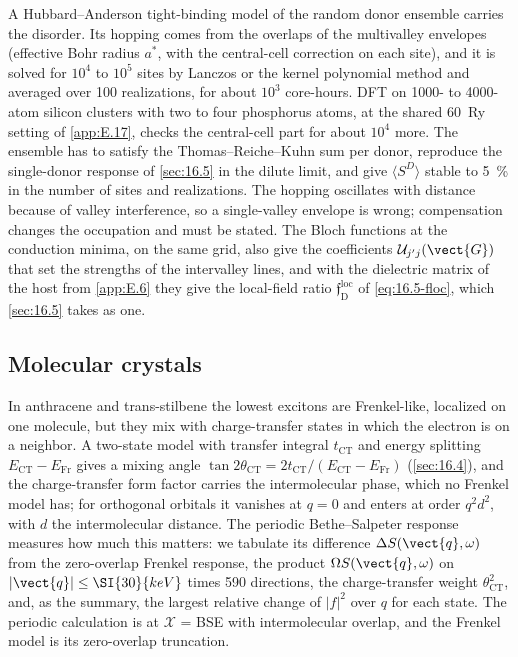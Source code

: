 A Hubbard--Anderson tight-binding model of the random donor ensemble carries the disorder. Its hopping comes from the overlaps of the multivalley envelopes (effective Bohr radius $a^*$, with the central-cell correction on each site), and it is solved for $10^4$ to $10^5$ sites by Lanczos or the kernel polynomial method and averaged over 100 realizations, for about $10^3$ core-hours. DFT on 1000- to 4000-atom silicon clusters with two to four phosphorus atoms, at the shared \SI{60}{Ry} setting of \cref{app:E.17}, checks the central-cell part for about $10^4$ more. The ensemble has to satisfy the Thomas--Reiche--Kuhn sum per donor, reproduce the single-donor response of \cref{sec:16.5} in the dilute limit, and give $\langle S^D\rangle$ stable to \SI{5}{\percent} in the number of sites and realizations. The hopping oscillates with distance because of valley interference, so a single-valley envelope is wrong; compensation changes the occupation and must be stated. The Bloch functions at the conduction minima, on the same grid, also give the coefficients $\mathcal{U}_{j'j}(\vect{G})$ that set the strengths of the intervalley lines, and with the dielectric matrix of the host from \cref{app:E.6} they give the local-field ratio $\mathfrak{f}^{\mathrm{loc}}_{\mathrm{D}}$ of \cref{eq:16.5-floc}, which \cref{sec:16.5} takes as one.

\subsection{Molecular crystals}

In anthracene and trans-stilbene the lowest excitons are Frenkel-like, localized on one molecule, but they mix with charge-transfer states in which the electron is on a neighbor. A two-state model with transfer integral $t_{\mathrm{CT}}$ and energy splitting $E_{\mathrm{CT}} - E_{\mathrm{Fr}}$ gives a mixing angle $\tan2\theta_{\mathrm{CT}} = 2t_{\mathrm{CT}}/(E_{\mathrm{CT}} - E_{\mathrm{Fr}})$ (\cref{sec:16.4}), and the charge-transfer form factor carries the intermolecular phase, which no Frenkel model has; for orthogonal orbitals it vanishes at $q = 0$ and enters at order $q^2d^2$, with $d$ the intermolecular distance. The periodic Bethe--Salpeter response measures how much this matters: we tabulate its difference $\Delta S(\vect{q},\omega)$ from the zero-overlap Frenkel response, the product $\Omega S(\vect{q},\omega)$ on $|\vect{q}| \le \SI{30}{keV}$ times 590 directions, the charge-transfer weight $\theta_{\mathrm{CT}}^2$, and, as the summary, the largest relative change of $|f|^2$ over $q$ for each state. The periodic calculation is at $\mathcal{X}$ = BSE with intermolecular overlap, and the Frenkel model is its zero-overlap truncation.


